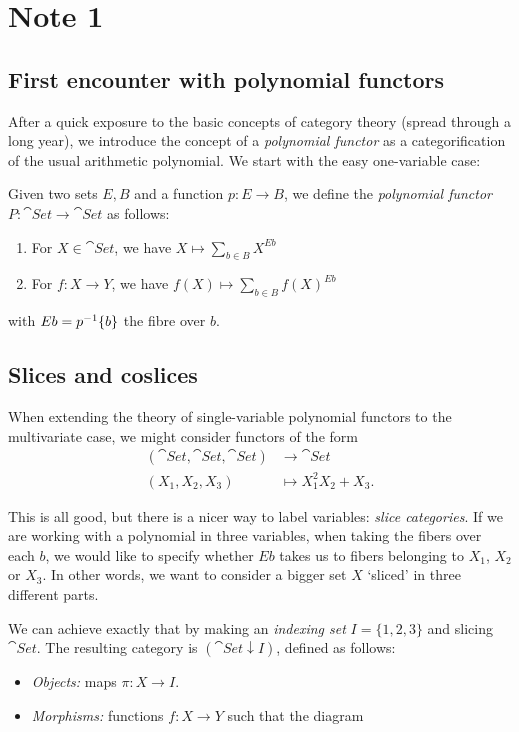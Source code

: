 
\section{Note 1}

\subsection{First encounter with polynomial functors}

After a quick exposure to the basic concepts of category theory (spread through a long year), we introduce the concept of a \emph{polynomial functor} as a categorification of the usual arithmetic polynomial. We start with the easy one-variable case:

\begin{definition}
	Given two sets $E,B$ and a function $p:E\to B$, we define the \emph{polynomial functor} $P:\cat{Set}\to\cat{Set}$ as follows:
    \begin{enumerate}
    \item For $X\in\cat{Set}$, we have $X \mapsto \sum_{b\in B} X^{Eb}$
    \item For $f:X\to Y$, we have $f(X) \mapsto \sum_{b\in B} f(X)^{Eb}$
    \end{enumerate}
    
    with $Eb=p^{-1}\{b\}$ the fibre over $b$.
\end{definition}

\subsection{Slices and coslices}

When extending the theory of single-variable polynomial functors to the multivariate case, we might consider functors of the form
\begin{align*}
	(\cat{Set},\cat{Set},\cat{Set}) &\to \cat{Set}\\
    (X_1,X_2,X_3) &\mapsto X_1^2X_2 + X_3.
\end{align*}

This is all good, but there is a nicer way to label variables: \emph{slice categories}. If we are working with a polynomial in three variables, when taking the fibers over each $b$, we would like to specify whether $Eb$ takes us to fibers belonging to $X_1$, $X_2$ or $X_3$. In other words, we want to consider a bigger set $X$ `sliced' in three different parts.

We can achieve exactly that by making an \emph{indexing set} $I=\{1,2,3\}$ and slicing $\cat{Set}$. The resulting category is $(\cat{Set}\downarrow I)$, defined as follows:
\begin{itemize}
\item \emph{Objects:} maps $\pi:X\to I$.
\item \emph{Morphisms:} functions $f:X\to Y$ such that the diagram
\end{itemize}

